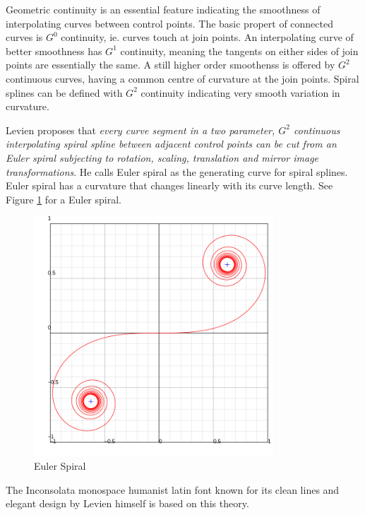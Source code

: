 \documentclass[10pt]{article}
\begin{document}
Geometric continuity is an essential feature indicating the smoothness of interpolating curves between control points. The basic propert of connected curves is $G^0$ continuity, ie. curves touch at join points. An interpolating curve of better smoothness has $G^1$ continuity, meaning the tangents on either sides of join points are essentially the same. A still higher order smoothenss is offered by $G^2$ continuous curves, having a common centre of curvature at the join points. 
Spiral splines can be defined with $G^2$ continuity indicating very smooth variation in curvature. 
 
Levien proposes that \textit{every curve segment in a two parameter,  $G^2$ continuous interpolating spiral spline between adjacent control points can be cut from an Euler spiral subjecting to rotation, scaling, translation and mirror image transformations}. He calls Euler spiral as the generating curve for spiral splines. Euler spiral has a curvature that changes linearly with its curve length. See Figure \ref{eulerspiral} for a Euler spiral.


\begin{figure}
	\centering
	\includegraphics[width=0.8\textwidth]{images/Euler_spiral.png}
	\caption{Euler Spiral}
	\label{eulerspiral}
\end{figure}


The Inconsolata monospace humanist latin font known for its clean lines and elegant design by Levien himself is based on this theory.
\end{document}
